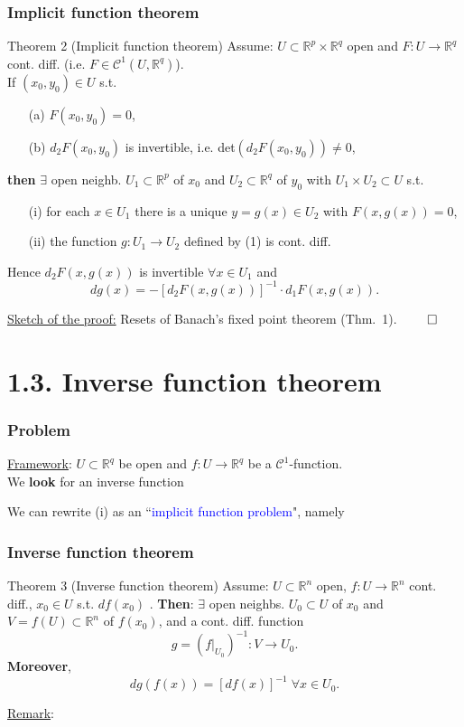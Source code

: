 \documentclass[10pt]{beamer}
\newcommand{\R}{\mathbb{R}}
\begin{document}
{\begin{frame} \frametitle{Implicit function theorem}
\begin{block}{Theorem 2 (Implicit function theorem)}
Assume: $U \subset \R^p \times \R^q$ open and $F:U \rightarrow \R^q$ cont. diff.  (i.e. $F \in \mathcal{C}^1(U,\R^q)$).\\
If $(x_0,y_0) \in U$ s.t.
\begin{itemize}
\item[(a)] $F(x_0,y_0)=0$,
\item[(b)] $d_2F(x_0,y_0)$ is invertible, i.e.  det$(d_2F(x_0,y_0)) \neq 0$,
\end{itemize}
\textbf{then} $\exists$ open neighb. $U_1 \subset \R^p$ of $x_0$ and $U_2 \subset \R^q$ of $y_0$ with $U_1 \times U_2 \subset U$ s.t.
\begin{itemize}
\item[(i)] for each $x\in U_1$ there is a unique $y=g(x) \in U_2$ with $F(x,g(x))=0$,
\item[(ii)] the function $g:U_1 \rightarrow U_2$ defined by (1) is cont. diff.
\end{itemize}
Hence $d_2F(x,g(x))$ is invertible $\forall x\in U_1$ and
$$dg(x)=-[d_2F(x,g(x))]^{-1} \cdot d_1 F(x,g(x)).$$
\end{block}
\underline{Sketch of the proof:}
Resets of Banach's fixed point theorem (Thm.~1). $\qed$
\end{frame}




\section{1.3.  Inverse function theorem}
\begin{frame}
\frametitle{Problem}
\underline{Framework}: $U \subset \R^q$ be open and $f:U \rightarrow  \R^q$ be a $\mathcal{C}^1$-function.\\
\vspace{0.2cm}
We \textbf{look} for an inverse function
\begin{block}{} 
\vspace{2cm}
\end{block}{}
We can rewrite (i) as an ``\textcolor{blue}{implicit function problem}", namely
\begin{block}{} 
\vspace{0.5cm}
\end{block}{}
\end{frame}

\begin{frame}
\frametitle{Inverse function theorem}
\begin{block}{Theorem 3 (Inverse function theorem)}
Assume: $U \subset \R^n$ open, $f: U \rightarrow \R^n$ cont. diff., $x_0 \in U$ s.t. 
$df(x_0)$ .
\textbf{Then}: $\exists$ open neighbs.  $U_0 \subset U$ of $x_0$ and $V=f(U) \subset \R^n$ of $f(x_0)$,
and a cont. diff. function $$g=(f|_{U_0})^{-1}:V \rightarrow U_0.$$
\vspace{0.2cm}
\textbf{Moreover},
$$dg(f(x))=[df(x)]^{-1} \; \forall x \in U_0.$$
\end{block}
\underline{Remark}:
\vspace{1cm}
\end{frame}

}
\end{document}
